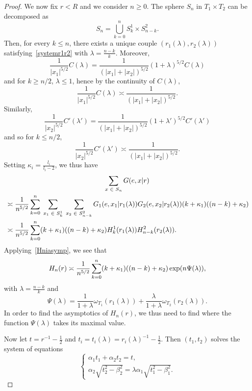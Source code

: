 \documentclass[AHL,Unicode,longabstracts]{cedram}
\let\originalleft\left
\let\originalright\right
\renewcommand{\left}{\mathopen{}\mathclose\bgroup\originalleft}
\renewcommand{\right}{\aftergroup\egroup\originalright}
\let\oldin\in
\renewcommand{\in}{\mathchoice{\oldin}{\oldin}{\,\oldin\,}{\,\oldin\,}}
\begin{document}
\begin{proof}
We now fix $r<R$ and we consider $n\geq0$. The sphere $S_n$ in $T_1\times T_2$ can be decomposed as
\[
S_n=\bigcup_{k=0}^nS_{k}^1\times S_{n-k}^2.
\]
Then, for every $k\leq n$, there exists a unique couple $(r_1(\lambda), r_2(\lambda))$ satisfying~\eqref{systemr1r2} with $\lambda=\frac{n-k}{k}$. Moreover,
\[
\frac{1}{|x_1|^{5/2}}C(\lambda)=\frac{1}{(|x_1|+|x_2|)^{5/2}}(1+\lambda)^{5/2}C(\lambda)
\]
and for $k\geq n/2$, $\lambda \leq 1$, hence by the continuity of $C(\lambda)$,
\[
\frac{1}{|x_1|^{5/2}}C(\lambda)\asymp \frac{1}{(|x_1|+|x_2|)^{5/2}}.
\]
Similarly,
\[
\frac{1}{|x_2|^{5/2}}C'(\lambda')=\frac{1}{(|x_1|+|x_2|)^{5/2}}(1+\lambda')^{5/2}C'(\lambda')
\]
and so for $k\leq n/2$,
\[
\frac{1}{|x_2|^{5/2}}C'(\lambda')\asymp \frac{1}{(|x_1|+|x_2|)^{5/2}}.
\]
Setting $\kappa_i=\frac{l_i}{l_i-2}$, we thus have
\begin{multline*}
\sum_{x\in S_n}G(e,x|r)\\
\begin{aligned}
&\asymp \frac{1}{n^{5/2}}\sum_{k=0}^n \;
\sum_{x_1\in S_k^1}\;\sum_{x_2\in S_{n-k}^2}G_1(e,x_1|r_1(\lambda)) G_2(e,x_2|r_2(\lambda))(k+\kappa_1)((n-k)+\kappa_2)\\
&\asymp \frac{1}{n^{5/2}}\sum_{k=0}^n(k+\kappa_1)((n-k)+\kappa_2) H^1_k(r_1(\lambda)) H^2_{n-k}(r_2(\lambda)).
\end{aligned}
\end{multline*}
Applying~\eqref{Hniasymp}, we see that
\begin{equation}\label{Hnasymp}
H_n(r) \asymp \frac{1}{n^{5/2}} \sum_{k = 0}^n (k+\kappa_1)((n-k)+\kappa_2) \exp \left(n \Psi(\lambda) \right),
\end{equation}
with $\lambda = \frac{n - k}{k}$ and
\[
\Psi(\lambda) = \frac{1}{1 + \lambda} \omega_{T_1}(r_1(\lambda)) + \frac{\lambda}{1 + \lambda} \omega_{T_2}(r_2(\lambda)).
\]
In order to find the asymptotics of $H_n(r)$, we thus need to find where the function $\Psi(\lambda)$ takes its maximal value.


Now let $t = r^{-1} - \frac{1}{2}$ and $t_i = t_i(\lambda) = r_i(\lambda)^{-1} - \frac{1}{2}$. Then $(t_1, t_2)$ solves the system of equations
\begin{equation}\label{systemt1t2}
\begin{cases}
\alpha_1 t_1 + \alpha_2 t_2 = t, \\
\alpha_2 \sqrt{t_2^2 - \beta_2^2} = \lambda \alpha_1 \sqrt{t_1^2 - \beta_1^2}.
\end{cases}
\end{equation}


\end{proof}
\end{document}

